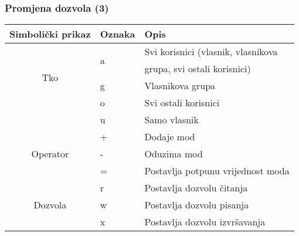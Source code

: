\documentclass[table,usenames,dvipsnames]{beamer}
\begin{document}
\begin{frame}[t]
\frametitle{Promjena dozvola (3)}
  \begin{table}[h]
  \begin{tabular}{|c|l|l|}
    \hline
    \rowcolor{BlueViolet!20}Simbolički prikaz & Oznaka & Opis       \\
    \hline
    \multirow{4}{*}{Tko} & \multirow{2}{*}{a} & Svi korisnici (vlasnik, 
           vlasnikova \\  & & grupa, svi ostali korisnici) \\ \cline{2-3}
                          & g & Vlasnikova grupa \\ \cline{2-3}
                          & o & Svi ostali korisnici \\ \cline{2-3}
                          & u & Samo vlasnik \\ \hline

    \multirow{3}{*}{Operator} & + & Dodaje mod \\ \cline{2-3}
                              & - & Oduzima mod \\ \cline{2-3}
     & = & Postavlja potpunu vrijednost moda\\ \hline 
    \multirow{3}{*}{Dozvola} & r & Postavlja dozvolu čitanja \\ \cline{2-3}
                             & w & Postavlja dozvolu pisanja \\ \cline{2-3}
     & x & Postavlja dozvolu izvršavanja\\ \hline
  \end{tabular}
  \end{table}
\end{frame}
\end{document}
